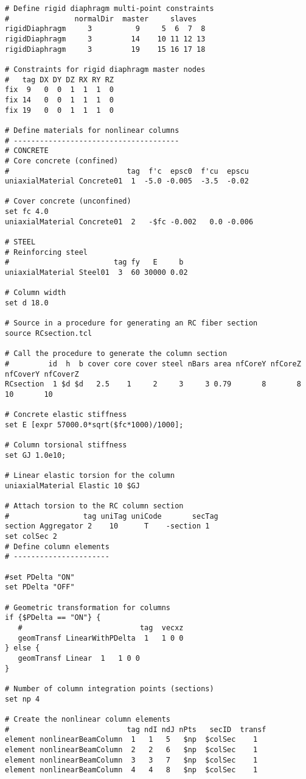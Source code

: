 \documentclass[12pt]{article}
\begin{document}
{\begin{verbatim}
# Define rigid diaphragm multi-point constraints
#               normalDir  master     slaves
rigidDiaphragm     3          9     5  6  7  8
rigidDiaphragm     3         14    10 11 12 13
rigidDiaphragm     3         19    15 16 17 18

# Constraints for rigid diaphragm master nodes
#   tag DX DY DZ RX RY RZ
fix  9   0  0  1  1  1  0
fix 14   0  0  1  1  1  0
fix 19   0  0  1  1  1  0

# Define materials for nonlinear columns
# --------------------------------------
# CONCRETE
# Core concrete (confined)
#                           tag  f'c  epsc0  f'cu  epscu
uniaxialMaterial Concrete01  1  -5.0 -0.005  -3.5  -0.02

# Cover concrete (unconfined)
set fc 4.0
uniaxialMaterial Concrete01  2   -$fc -0.002   0.0 -0.006

# STEEL
# Reinforcing steel
#                        tag fy   E     b
uniaxialMaterial Steel01  3  60 30000 0.02

# Column width
set d 18.0

# Source in a procedure for generating an RC fiber section
source RCsection.tcl

# Call the procedure to generate the column section
#         id  h  b cover core cover steel nBars area nfCoreY nfCoreZ nfCoverY nfCoverZ
RCsection  1 $d $d   2.5    1     2     3     3 0.79       8       8       10       10

# Concrete elastic stiffness
set E [expr 57000.0*sqrt($fc*1000)/1000];

# Column torsional stiffness
set GJ 1.0e10;

# Linear elastic torsion for the column
uniaxialMaterial Elastic 10 $GJ

# Attach torsion to the RC column section
#                 tag uniTag uniCode       secTag
section Aggregator 2    10      T    -section 1
set colSec 2
# Define column elements
# ----------------------

#set PDelta "ON"
set PDelta "OFF"

# Geometric transformation for columns
if {$PDelta == "ON"} {
   #                           tag  vecxz
   geomTransf LinearWithPDelta  1   1 0 0
} else {
   geomTransf Linear  1   1 0 0
}

# Number of column integration points (sections)
set np 4

# Create the nonlinear column elements
#                           tag ndI ndJ nPts   secID  transf
element nonlinearBeamColumn  1   1   5   $np  $colSec    1
element nonlinearBeamColumn  2   2   6   $np  $colSec    1
element nonlinearBeamColumn  3   3   7   $np  $colSec    1
element nonlinearBeamColumn  4   4   8   $np  $colSec    1


\end{verbatim}}
\end{document}
